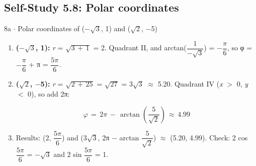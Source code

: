 \documentclass[11pt]{article}
\begin{document}
\begin{keepsection}\subsection{Self-Study 5.8: Polar coordinates}

\begin{workedbox}{8a \ensuremath{\cdot} Polar coordinates of (\ensuremath{-}\ensuremath{\sqrt{3}}, 1) and (\ensuremath{\sqrt{2}}, \ensuremath{-}5)}
\begin{enumerate}
\item \textbf{(\ensuremath{-}\ensuremath{\sqrt{3}}, 1):} \textit{r} = \ensuremath{\sqrt{3\, +\, 1}} = 2. Quadrant II, and arctan({\small\ensuremath{\dfrac{1}{-\sqrt{3}}}}) = \ensuremath{-}{\small\ensuremath{\dfrac{π}{6}}}, so φ = \ensuremath{-}{\small\ensuremath{\dfrac{π}{6}}} + π = {\small\ensuremath{\dfrac{5π}{6}}}.
\item {}
\textbf{(\ensuremath{\sqrt{2}}, \ensuremath{-}5):} \textit{r} = \ensuremath{\sqrt{2\, +\, 25}} = \ensuremath{\sqrt{27}} = 3\ensuremath{\sqrt{3}} \ensuremath{\approx} 5.20. Quadrant IV (\textit{x} \ensuremath{>} 0, \textit{y} \ensuremath{<} 0), so add 2π:

\begin{equation*}φ\, =\, 2π\, -\, \arctan \left(\dfrac{5}{\sqrt{2}}\right)\, \approx \, 4.99\end{equation*}
\item Results: (2, {\small\ensuremath{\dfrac{5π}{6}}}) and (3\ensuremath{\sqrt{3}}, 2π \ensuremath{-} arctan {\small\ensuremath{\dfrac{5}{\sqrt{2}}}}) \ensuremath{\approx} (5.20, 4.99). Check: 2 cos {\small\ensuremath{\dfrac{5π}{6}}} = \ensuremath{-}\ensuremath{\sqrt{3}} and 2 sin {\small\ensuremath{\dfrac{5π}{6}}} = 1.
\end{enumerate}
\end{workedbox}

\end{keepsection}
\end{document}
